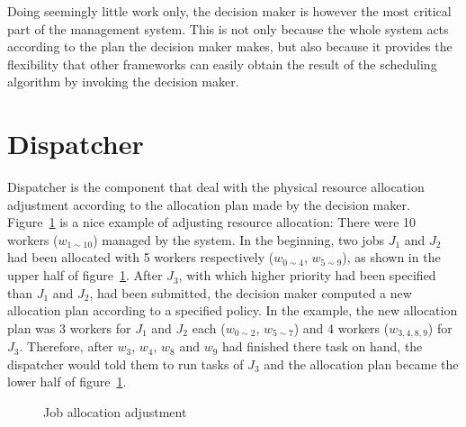 Doing seemingly little work only, the decision maker is however the most
critical part of the management system. This is not only because the
whole system acts according to the plan the decision maker makes, but
also because it provides the flexibility that other frameworks can
easily obtain the result of the scheduling algorithm by invoking the
decision maker.

\section{Dispatcher}

Dispatcher is the component that deal with the physical resource
allocation adjustment according to the allocation plan made by the
decision maker.  Figure~\ref{fig:allocation-adjustment} is a nice
example of adjusting resource allocation: There were 10 workers
($w_{1\sim10}$) managed by the system.  In the beginning, two jobs $J_1$
and $J_2$ had been allocated with 5 workers respectively ($w_{0\sim4}$,
$w_{5\sim9}$), as shown in the upper half of
figure~\ref{fig:allocation-adjustment}.  After $J_3$, with which higher
priority had been specified than $J_1$ and $J_2$, had been submitted,
the decision maker computed a new allocation plan according to a
specified policy.  In the example, the new allocation plan was 3 workers
for $J_1$ and $J_2$ each ($w_{0\sim2}$, $w_{5\sim7}$) and 4 workers
($w_{3,4,8,9}$) for $J_3$.  Therefore, after $w_3$, $w_4$, $w_8$ and $
w_9$ had finished there task on hand, the dispatcher would told them to
run tasks of $J_3$ and the allocation plan became the lower half of
figure~\ref{fig:allocation-adjustment}.

\begin{figure}
  \centering
  
  \caption{Job allocation adjustment}
  \label{fig:allocation-adjustment}
\end{figure}
